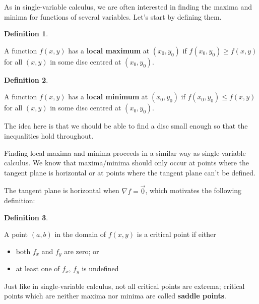 \documentclass[
]{book}
\providecommand{\tightlist}{%
  \setlength{\itemsep}{0pt}\setlength{\parskip}{0pt}}
\theoremstyle{definition}
\newtheorem{definition}{Definition}[chapter]
\theoremstyle{definition}
\theoremstyle{definition}
\theoremstyle{definition}
\theoremstyle{remark}
\begin{document}
As in single-variable calculus, we are often interested in finding the maxima and minima for functions of several variables. Let's start by defining them.

\begin{definition}
\protect\hypertarget{def:unlabeled-div-55}{}\label{def:unlabeled-div-55}

A function \(f(x,y)\) has a \textbf{local maximum} at \((x_0, y_0)\) if \(f(x_0, y_0)\geq f(x,y)\) for all \((x,y)\) in some disc centred at \((x_0, y_0)\).

\end{definition}

\begin{definition}
\protect\hypertarget{def:unlabeled-div-56}{}\label{def:unlabeled-div-56}

A function \(f(x,y)\) has a \textbf{local minimum} at \((x_0, y_0)\) if \(f(x_0, y_0)\leq f(x,y)\) for all \((x,y)\) in some disc centred at \((x_0, y_0)\).

\end{definition}

The idea here is that we should be able to find a disc small enough so that the inequalities hold throughout.

Finding local maxima and minima proceeds in a similar way as single-variable calculus. We know that maxima/minima should only occur at points where the tangent plane is horizontal or at points where the tangent plane can't be defined.

The tangent plane is horizontal when \(\nabla f = \vec{0}\), which motivates the following definition:

\begin{definition}
\protect\hypertarget{def:unlabeled-div-57}{}\label{def:unlabeled-div-57}

A point \((a,b)\) in the domain of \(f(x,y)\) is a critical point if either

\begin{itemize}
\tightlist
\item
  both \(f_x\) and \(f_y\) are zero; or
\item
  at least one of \(f_x\), \(f_y\) is undefined
\end{itemize}

\end{definition}

Just like in single-variable calculus, not all critical points are extrema; critical points which are neither maxima nor minima are called \textbf{saddle points}.
\end{document}
